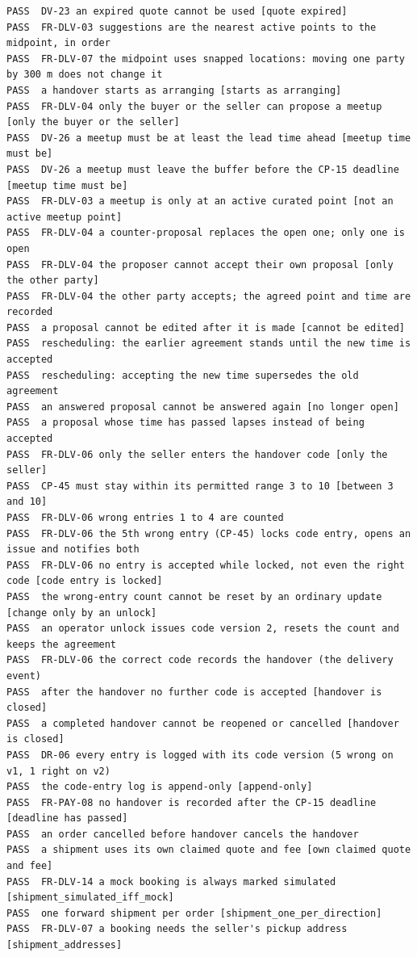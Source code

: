 \documentclass[11pt,a4paper]{article}
\begin{document}
{\begin{verbatim}
PASS  DV-23 an expired quote cannot be used [quote expired]
PASS  FR-DLV-03 suggestions are the nearest active points to the midpoint, in order
PASS  FR-DLV-07 the midpoint uses snapped locations: moving one party by 300 m does not change it
PASS  a handover starts as arranging [starts as arranging]
PASS  FR-DLV-04 only the buyer or the seller can propose a meetup [only the buyer or the seller]
PASS  DV-26 a meetup must be at least the lead time ahead [meetup time must be]
PASS  DV-26 a meetup must leave the buffer before the CP-15 deadline [meetup time must be]
PASS  FR-DLV-03 a meetup is only at an active curated point [not an active meetup point]
PASS  FR-DLV-04 a counter-proposal replaces the open one; only one is open
PASS  FR-DLV-04 the proposer cannot accept their own proposal [only the other party]
PASS  FR-DLV-04 the other party accepts; the agreed point and time are recorded
PASS  a proposal cannot be edited after it is made [cannot be edited]
PASS  rescheduling: the earlier agreement stands until the new time is accepted
PASS  rescheduling: accepting the new time supersedes the old agreement
PASS  an answered proposal cannot be answered again [no longer open]
PASS  a proposal whose time has passed lapses instead of being accepted
PASS  FR-DLV-06 only the seller enters the handover code [only the seller]
PASS  CP-45 must stay within its permitted range 3 to 10 [between 3 and 10]
PASS  FR-DLV-06 wrong entries 1 to 4 are counted
PASS  FR-DLV-06 the 5th wrong entry (CP-45) locks code entry, opens an issue and notifies both
PASS  FR-DLV-06 no entry is accepted while locked, not even the right code [code entry is locked]
PASS  the wrong-entry count cannot be reset by an ordinary update [change only by an unlock]
PASS  an operator unlock issues code version 2, resets the count and keeps the agreement
PASS  FR-DLV-06 the correct code records the handover (the delivery event)
PASS  after the handover no further code is accepted [handover is closed]
PASS  a completed handover cannot be reopened or cancelled [handover is closed]
PASS  DR-06 every entry is logged with its code version (5 wrong on v1, 1 right on v2)
PASS  the code-entry log is append-only [append-only]
PASS  FR-PAY-08 no handover is recorded after the CP-15 deadline [deadline has passed]
PASS  an order cancelled before handover cancels the handover
PASS  a shipment uses its own claimed quote and fee [own claimed quote and fee]
PASS  FR-DLV-14 a mock booking is always marked simulated [shipment_simulated_iff_mock]
PASS  one forward shipment per order [shipment_one_per_direction]
PASS  FR-DLV-07 a booking needs the seller's pickup address [shipment_addresses]

\end{verbatim}}
\end{document}
